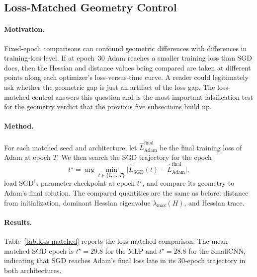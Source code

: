 \documentclass[11pt]{article}
\begin{document}
\subsection{Loss-Matched Geometry Control}
\label{sec:loss-matched}

\paragraph{Motivation.} Fixed-epoch comparisons can confound geometric differences with differences in training-loss level. If at epoch~30 Adam reaches a smaller training loss than SGD does, then the Hessian and distance values being compared are taken at different points along each optimizer's loss-versus-time curve. A reader could legitimately ask whether the geometric gap is just an artifact of the loss gap. The loss-matched control answers this question and is the most important falsification test for the geometry verdict that the previous five subsections build up.

\paragraph{Method.} For each matched seed and architecture, let $\widehat L_{\mathrm{Adam}}^{\mathrm{final}}$ be the final training loss of Adam at epoch $T$. We then search the SGD trajectory for the epoch
\[
t^\star = \arg\min_{t\in\{1,\dots,T\}} \big| \widehat L_{\mathrm{SGD}}(t) - \widehat L_{\mathrm{Adam}}^{\mathrm{final}}\big|,
\]
load SGD's parameter checkpoint at epoch $t^\star$, and compare its geometry to Adam's final solution. The compared quantities are the same as before: distance from initialization, dominant Hessian eigenvalue $\lambda_{\max}(H)$, and Hessian trace.

\paragraph{Results.} Table~\ref{tab:loss-matched} reports the loss-matched comparison. The mean matched SGD epoch is $t^\star = 29.8$ for the MLP and $t^\star = 28.8$ for the SmallCNN, indicating that SGD reaches Adam's final loss late in its 30-epoch trajectory in both architectures.
\end{document}

